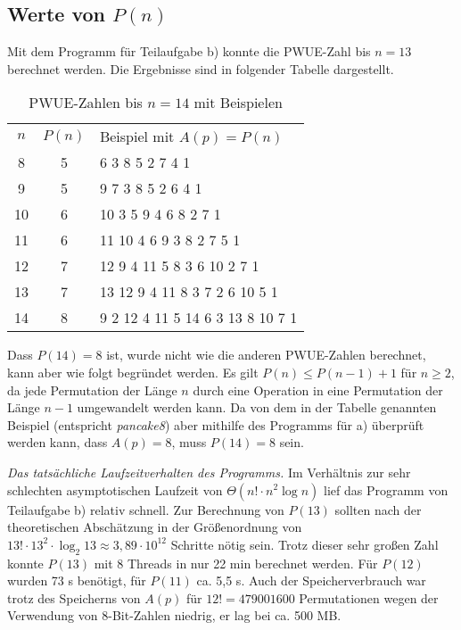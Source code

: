 \documentclass[a4paper, 10pt, ngerman]{article}
\begin{document}
\subsection{Werte von $P(n)$}

Mit dem Programm für Teilaufgabe b) konnte die PWUE-Zahl bis $n = 13$ berechnet werden. Die Ergebnisse sind in folgender Tabelle dargestellt.

\begin{table}[H]
    \centering
    \begin{tabular}{c c l}
        \toprule
        $n$ & $P(n)$ & Beispiel mit $A(p) = P(n)$       \\
        \cmidrule{1-3}
        8   & 5      & 6 3 8 5 2 7 4 1                  \\
        9   & 5      & 9 7 3 8 5 2 6 4 1                \\
        10  & 6      & 10 3 5 9 4 6 8 2 7 1             \\
        11  & 6      & 11 10 4 6 9 3 8 2 7 5 1          \\
        12  & 7      & 12 9 4 11 5 8 3 6 10 2 7 1       \\
        13  & 7      & 13 12 9 4 11 8 3 7 2 6 10 5 1    \\
        14  & 8      & 9 2 12 4 11 5 14 6 3 13 8 10 7 1 \\
        \bottomrule
    \end{tabular}
    \caption{PWUE-Zahlen bis $n = 14$ mit Beispielen}
\end{table}

Dass $P(14) = 8$ ist, wurde nicht wie die anderen PWUE-Zahlen berechnet, kann aber wie folgt begründet werden. Es gilt $P(n) \le P(n - 1) + 1$ für $n \ge 2$, da jede Permutation der Länge $n$ durch eine Operation in eine Permutation der Länge $n - 1$ umgewandelt werden kann. Da von dem in der Tabelle genannten Beispiel (entspricht \emph{pancake8}) aber mithilfe des Programms für a) überprüft werden kann, dass $A(p) = 8$, muss $P(14) = 8$ sein.
\medskip

\emph{Das tatsächliche Laufzeitverhalten des Programms.} Im Verhältnis zur sehr schlechten asymptotischen Laufzeit von $\Theta(n! \cdot n^2 \log n)$ lief das Programm von Teilaufgabe b) relativ schnell. Zur Berechnung von $P(13)$ sollten nach der theoretischen Abschätzung in der Größenordnung von $13! \cdot 13^2 \cdot \log_2 13 \approx 3,89 \cdot 10^{12}$ Schritte nötig sein. Trotz dieser sehr großen Zahl konnte $P(13)$ mit 8 Threads in nur 22 min berechnet werden. Für $P(12)$ wurden 73 s benötigt, für $P(11)$ ca. 5,5 s. Auch der Speicherverbrauch war trotz des Speicherns von $A(p)$ für $12! = 479001600$ Permutationen wegen der Verwendung von 8-Bit-Zahlen niedrig, er lag bei ca. 500 MB.  
\end{document}
